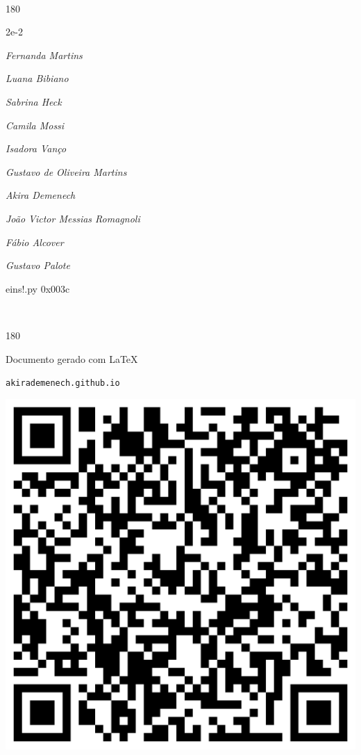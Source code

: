 \documentclass[12pt]{article}
\begin{document}
	\ 
	\vfill
	\begin{turn}{180}	
		\begin{minipage}{\textwidth}
		  	\ttfamily %
			\centering
			{\Huge 2e-2}
		  
			\hfill
		  
			

\textit{\small Fernanda Martins}

\textit{\small Luana Bibiano}

\textit{\small Sabrina Heck}

\textit{\small Camila Mossi}

\textit{\small Isadora Vanço}

\textit{\small Gustavo de Oliveira Martins}

\textit{\small Akira Demenech}

\textit{\small João Victor Messias Romagnoli}

\textit{\small Fábio Alcover}

\textit{\small Gustavo Palote}

\bigskip

eins!.py
0x003c


		\end{minipage}	
	\end{turn}
	\vfill
	\

\pagebreak

	\begin{turn}{180}	
		\begin{minipage}{\textwidth}		  
		  Documento gerado com \LaTeX			
		  
		  \texttt{akirademenech.github.io}

		  \includegraphics[height=0.3\textheight]{2e-2.pdf}

		\end{minipage}	
	\end{turn}  
		  
\end{document}
